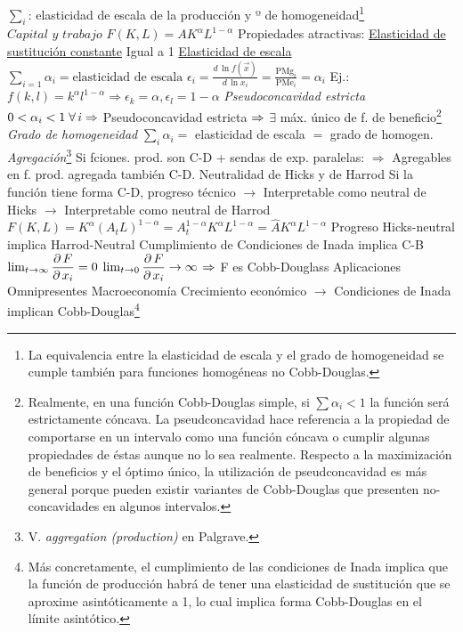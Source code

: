 \documentclass{nuevotema}
\begin{document}
\begin{esquemal}
				\4[] $\sum_i$: elasticidad de escala de la producción y º de homogeneidad\footnote{La equivalencia entre la elasticidad de escala y el grado de homogeneidad se cumple también para funciones homogéneas no Cobb-Douglas.}
				\4 $\textit{Capital y trabajo} $
				\4[] $ F(K,L) = A K^\alpha L^{1-\alpha} $
				\4[]  %
			\3 Propiedades atractivas:
				\4[(i)] \underline{Elasticidad de sustitución constante}
				\4[] Igual a 1
				\4[(ii)] \underline{Elasticidad de escala}
				\4[] $\sum_{i=1} \alpha_i = \text{elasticidad de escala}$
				\4[] $\epsilon_i = \frac{d \, \ln f(\vec{x})}{d \, \ln x_i} = \frac{\text{PMg}_i}{\text{PMe}_i} = \alpha_i$
				\4[] Ej.: $f(k,l) = k^\alpha l^{1-\alpha} \Rightarrow \epsilon_k = \alpha, \epsilon_l = 1-\alpha$
				\4[(iii)] \textit{Pseudoconcavidad estricta}
				\4 $0 < \alpha_i < 1 \; \forall \, i \Rightarrow$ Pseudoconcavidad estricta $\Rightarrow$
				\4[] $\exists$ máx. único de f. de beneficio\footnote{Realmente, en una función Cobb-Douglas simple, si $\sum \alpha_i < 1$ la función será estrictamente cóncava. La pseudconcavidad hace referencia a la propiedad de comportarse en un intervalo como una función cóncava o cumplir algunas propiedades de éstas aunque no lo sea realmente. Respecto a la maximización de beneficios y el óptimo único, la utilización de pseudconcavidad es más general porque pueden existir variantes de Cobb-Douglas que presenten no-concavidades en algunos intervalos.}
				\4[(iv)] \textit{Grado de homogeneidad}
				\4[] $\sum_i \alpha_i =$ elasticidad de escala $=$ grado de homogen.
				\4[(v)] \textit{Agregación}\footnote{V. \textit{aggregation (production)} en Palgrave.}
				\4[] Si fciones. prod. son C-D + sendas de exp. paralelas:
				\4[] $\Rightarrow$ Agregables en f. prod. agregada también C-D.
				\4[(vi)] Neutralidad de Hicks y de Harrod
				\4[] Si la función tiene forma C-D, progreso técnico
				\4[] $\to$ Interpretable como neutral de Hicks
				\4[] $\to$ Interpretable como neutral de Harrod
				\4[] $F(K, L) = K^\alpha (A_t L)^{1-\alpha}= A_t^{1-\alpha} K^\alpha L^{1-\alpha} = \hat{A} K^\alpha L^{1-\alpha}$
				\4[(v)] Progreso Hicks-neutral implica Harrod-Neutral
				\4[(vi)] Cumplimiento de Condiciones de Inada implica C-B
				\4[] $\lim_{t \to \infty} \dfrac{\partial \, F}{\partial \, x_i} = 0$
				\4[] $\lim_{t \to 0} \dfrac{\partial \, F}{\partial \, x_i} \to \infty$
				\4[] $\Rightarrow$ F es Cobb-Douglass
			\3 Aplicaciones
				\4 Omnipresentes
				\4 Macroeconomía
				\4 Crecimiento económico
				\4[] $\to$ Condiciones de Inada implican Cobb-Douglas\footnote{Más concretamente, el cumplimiento de las condiciones de Inada implica que la función de producción habrá de tener una elasticidad de sustitución que se aproxime asintóticamente a 1, lo cual implica forma Cobb-Douglas en el límite asintótico.}

\end{esquemal}
\end{document}
